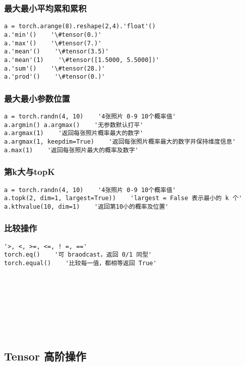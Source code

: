 \subsubsection{最大最小平均累和累积}
\begin{lstlisting}
a = torch.arange(8).reshape(2,4).'float'()
a.'min'()    '\#tensor(0.)'
a.'max'()    '\#tensor(7.)'
a.'mean'()    '\#tensor(3.5)'
a.'mean'(1)    '\#tensor([1.5000, 5.5000])'
a.'sum'()    '\#tensor(28.)'
a.'prod'()    '\#tensor(0.)'
\end{lstlisting}

\subsubsection{最大最小参数位置}
\begin{lstlisting}
a = torch.randn(4, 10)    '4张照片 0-9 10个概率值'
a.argmin() a.argmax()    '无参数默认打平'
a.argmax(1)    '返回每张照片概率最大的数字'
a.argmax(1, keepdim=True)    '返回每张照片概率最大的数字并保持维度信息'
a.max(1)    '返回每张照片最大的概率及数字'
\end{lstlisting}

\subsubsection{第k大与topK}
\begin{lstlisting}
a = torch.randn(4, 10)    '4张照片 0-9 10个概率值'
a.topk(2, dim=1, largest=True))    'largest = False 表示最小的 k 个'
a.kthvalue(10, dim=1)    '返回第10小的概率及位置'
\end{lstlisting}

\subsubsection{比较操作}
\begin{lstlisting}
'>, <, >=, <=, ! =, =='
torch.eq()    '可 braodcast，返回 0/1 同型'
torch.equal()    '比较每一值，都相等返回 True'
\end{lstlisting}
~\\
~\\
~\\
~\\
~\\
~\\

\subsection{Tensor 高阶操作}
